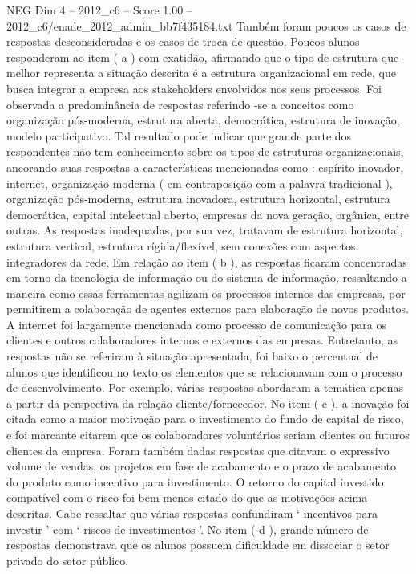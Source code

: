 \begin{textsample}{NEG Dim 4 – 2012\_c6 – Score 1.00 – 2012\_c6/enade\_2012\_admin\_bb7f435184.txt}
Também foram poucos os casos de respostas desconsideradas e os casos de troca de questão.
Poucos alunos responderam ao item ( a ) com exatidão, afirmando que o tipo de estrutura que melhor representa a situação descrita é a estrutura organizacional em rede, que busca integrar a empresa aos stakeholders envolvidos nos seus processos.
Foi observada a predominância de respostas referindo -se a conceitos como organização pós-moderna, estrutura aberta, democrática, estrutura de inovação, modelo participativo.
Tal resultado pode indicar que grande parte dos respondentes não tem conhecimento sobre os tipos de estruturas organizacionais, ancorando suas respostas a características mencionadas como : espírito inovador, internet, organização moderna ( em contraposição com a palavra tradicional ), organização pós-moderna, estrutura inovadora, estrutura horizontal, estrutura democrática, capital intelectual aberto, empresas da nova geração, orgânica, entre outras.
As respostas inadequadas, por sua vez, tratavam de estrutura horizontal, estrutura vertical, estrutura rígida/flexível, sem conexões com aspectos integradores da rede.
Em relação ao item ( b ), as respostas ficaram concentradas em torno da tecnologia de informação ou do sistema de informação, ressaltando a maneira como essas ferramentas agilizam os processos internos das empresas, por permitirem a colaboração de agentes externos para elaboração de novos produtos.
A internet foi largamente mencionada como processo de comunicação para os clientes e outros colaboradores internos e externos das empresas.
Entretanto, as respostas não se referiram à situação apresentada, foi baixo o percentual de alunos que identificou no texto os elementos que se relacionavam com o processo de desenvolvimento.
Por exemplo, várias respostas abordaram a temática apenas a partir da perspectiva da relação cliente/fornecedor.
No item ( c ), a inovação foi citada como a maior motivação para o investimento do fundo de capital de risco, e foi marcante citarem que os colaboradores voluntários seriam clientes ou futuros clientes da empresa.
Foram também dadas respostas que citavam o expressivo volume de vendas, os projetos em fase de acabamento e o prazo de acabamento do produto como incentivo para investimento.
O retorno do capital investido compatível com o risco foi bem menos citado do que as motivações acima descritas.
Cabe ressaltar que várias respostas confundiram ‘ incentivos para investir ’ com ‘ riscos de investimentos ’.
No item ( d ), grande número de respostas demonstrava que os alunos possuem dificuldade em dissociar o setor privado do setor público.

\end{textsample}
